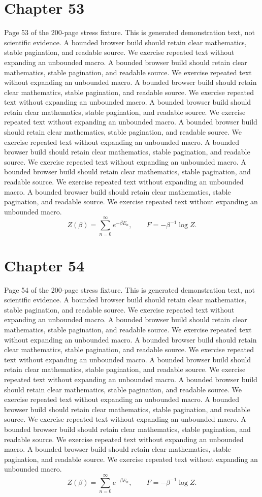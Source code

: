 \documentclass[11pt]{article}
\begin{document}
\section*{Chapter 53}
Page 53 of the 200-page stress fixture. This is generated demonstration text, not scientific evidence.
A bounded browser build should retain clear mathematics, stable pagination, and readable source. We exercise repeated text without expanding an unbounded macro.
A bounded browser build should retain clear mathematics, stable pagination, and readable source. We exercise repeated text without expanding an unbounded macro.
A bounded browser build should retain clear mathematics, stable pagination, and readable source. We exercise repeated text without expanding an unbounded macro.
A bounded browser build should retain clear mathematics, stable pagination, and readable source. We exercise repeated text without expanding an unbounded macro.
A bounded browser build should retain clear mathematics, stable pagination, and readable source. We exercise repeated text without expanding an unbounded macro.
A bounded browser build should retain clear mathematics, stable pagination, and readable source. We exercise repeated text without expanding an unbounded macro.
A bounded browser build should retain clear mathematics, stable pagination, and readable source. We exercise repeated text without expanding an unbounded macro.
A bounded browser build should retain clear mathematics, stable pagination, and readable source. We exercise repeated text without expanding an unbounded macro.
\[Z(\beta)=\sum_{n=0}^{\infty}e^{-\beta E_n},\qquad F=-\beta^{-1}\log Z.\]
\newpage
\section*{Chapter 54}
Page 54 of the 200-page stress fixture. This is generated demonstration text, not scientific evidence.
A bounded browser build should retain clear mathematics, stable pagination, and readable source. We exercise repeated text without expanding an unbounded macro.
A bounded browser build should retain clear mathematics, stable pagination, and readable source. We exercise repeated text without expanding an unbounded macro.
A bounded browser build should retain clear mathematics, stable pagination, and readable source. We exercise repeated text without expanding an unbounded macro.
A bounded browser build should retain clear mathematics, stable pagination, and readable source. We exercise repeated text without expanding an unbounded macro.
A bounded browser build should retain clear mathematics, stable pagination, and readable source. We exercise repeated text without expanding an unbounded macro.
A bounded browser build should retain clear mathematics, stable pagination, and readable source. We exercise repeated text without expanding an unbounded macro.
A bounded browser build should retain clear mathematics, stable pagination, and readable source. We exercise repeated text without expanding an unbounded macro.
A bounded browser build should retain clear mathematics, stable pagination, and readable source. We exercise repeated text without expanding an unbounded macro.
\[Z(\beta)=\sum_{n=0}^{\infty}e^{-\beta E_n},\qquad F=-\beta^{-1}\log Z.\]
\newpage
\end{document}
